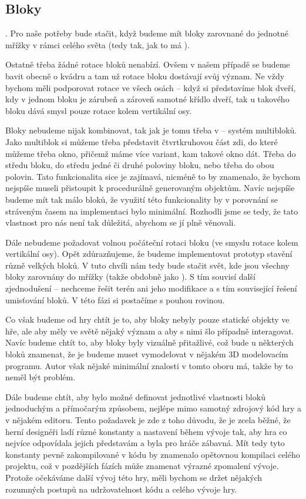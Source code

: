 
\subsection{Bloky}

. Pro naše potřeby bude stačit, když budeme mít bloky zarovnané do jednotné mřížky v rámci celého světa (tedy tak, jak to má \MC{}).


Ostatně třeba \MC{} žádné rotace bloků nenabízí. Ovšem v našem případě se budeme bavit obecně o kvádru a tam už rotace bloku dostávají svůj význam. Ne vždy bychom měli podporovat rotace ve všech osách -- když si představíme blok dveří, kdy v jednom bloku je zárubeň a zároveň samotné křídlo dveří, tak u takového bloku dává smysl pouze rotace kolem vertikální osy. 


 Bloky nebudeme nijak kombinovat, tak jak je tomu třeba v \ME{} -- systém multibloků. Jako multiblok si můžeme třeba představit čtvrtkruhovou část zdi, do které můžeme  třeba okno, přičemž máme více variant, kam takové okno dát. Třeba do středu bloku, do středu jedné či druhé poloviny bloku, nebo třeba do obou polovin. Tato funkcionalita sice je zajímavá, nicméně to by znamenalo, že bychom nejspíše museli přistoupit k procedurálně generovaným objektům. Navíc nejspíše budeme mít tak málo bloků, že využití této funkcionality by v porovnání se stráveným časem na implementaci bylo minimální. Rozhodli jsme se tedy, že tato vlastnost pro nás není tak důležitá, abychom se jí plně věnovali. 

Dále nebudeme požadovat volnou počáteční rotaci bloku (ve smyslu rotace kolem vertikální osy). Opět zdůrazňujeme, že budeme implementovat prototyp stavění různě velkých bloků. V tuto chvíli nám tedy bude stačit svět, kde jsou všechny bloky zarovnány do mřížky (takže obdobně jako \MC{}). S tím souvisí další zjednodušení -- nechceme řešit terén ani jeho modifikace a s tím související řešení umisťování bloků. V této fázi si postačíme s pouhou rovinou.

Co však budeme od hry chtít je to, aby bloky nebyly pouze statické objekty ve hře, ale aby měly ve světě nějaký význam a aby s nimi šlo případně interagovat. Navíc budeme chtít to, aby bloky byly vizuálně přitažlivé, což bude u některých bloků znamenat, že je budeme muset vymodelovat v nějakém 3D modelovacím programu. Autor však nějaké minimální znalosti v tomto oboru má, takže by to neměl být problém.

Dále budeme chtít, aby bylo možné definovat jednotlivé vlastnosti bloků jednoduchým a přímočarým způsobem, nejlépe mimo samotný zdrojový kód hry a v nějakém editoru. Tento požadavek je zde z toho důvodu, že je zcela běžné, že herní designéři ladí různé konstanty a nastavení během vývoje tak, aby hra co nejvíce odpovídala jejich představám a byla pro hráče zábavná. Mít tedy tyto konstanty pevně zakompilované v kódu by znamenalo opětovnou kompilaci celého projektu, což v pozdějších fázích může znamenat výrazné zpomalení vývoje. Protože očekáváme další vývoj této hry, měli bychom se držet nějakých rozumných postupů na udržovatelnost kódu a celého vývoje hry.


